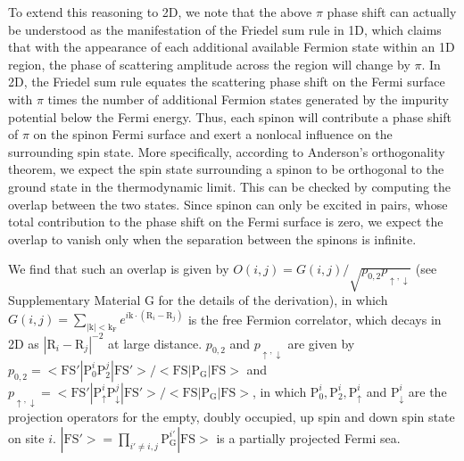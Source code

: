 \documentclass[12pt]{article}
\begin{document}
To extend this reasoning to 2D, we note that the above $\pi$ phase shift can actually be understood as the manifestation of the Friedel sum rule in 1D\cite{Friedel}, which claims that with the appearance of each additional available Fermion state within an 1D region, the phase of scattering amplitude across the region will change by $\pi$. In 2D, the Friedel sum rule equates the scattering phase shift on the Fermi surface with $\pi$ times the number of additional Fermion states generated by the impurity potential below the Fermi energy.  Thus, each spinon will contribute a phase shift of $\pi$ on the spinon Fermi surface and exert a nonlocal influence on the surrounding spin state. More specifically, according to Anderson's orthogonality theorem\cite{Anderson1,Anderson2,NDD}, we expect the spin state surrounding a spinon to be orthogonal to the ground state in the thermodynamic limit. This can be checked by computing the overlap between the two states. Since spinon can only be excited in pairs, whose total contribution to the phase shift on the Fermi surface is zero, we expect the overlap to vanish only when the separation between the spinons is infinite.   

We find that such an overlap is given by $O(i,j)=G(i,j)/\sqrt{p_{0,2}p_{\uparrow,\downarrow}}$ (see Supplementary Material  G for the details of the derivation), in which $G(i,j)=\sum_{\mathrm{|k|<k_{F}}}e^{i\mathrm{k}\cdot(\mathrm{R}_{i}-\mathrm{R}_{j})}$ is the free Fermion correlator,  which decays in 2D as $|\mathrm{R}_{i}-\mathrm{R}_{j}|^{-2}$ at large distance. $p_{0,2}$ and $p_{\uparrow,\downarrow}$ are given by $p_{0,2}=<\mathrm{FS'}| \mathrm{P}^{i}_{0}\mathrm{P}^{j}_{2} |\mathrm{FS'}>/<\mathrm{FS}| \mathrm{P_{G}}|\mathrm{FS}>$ and $p_{\uparrow,\downarrow}=<\mathrm{FS'}| \mathrm{P}^{i}_{\uparrow}\mathrm{P}^{j}_{\downarrow} |\mathrm{FS'}>/<\mathrm{FS}| \mathrm{P_{G}}|\mathrm{FS}>$,
in which $\mathrm{P}^{i}_{0},\mathrm{P}^{i}_{2}, \mathrm{P}^{i}_{\uparrow}$ and $\mathrm{P}^{i}_{\downarrow}$ are the projection operators for the empty, doubly occupied, up spin and down spin state on  site $i$. $|\mathrm{FS'}>=\prod_{i'\neq i,j}\mathrm{P}^{i'}_{\mathrm{G}}|\mathrm{FS}>$ is a partially projected Fermi sea.  
\end{document}
